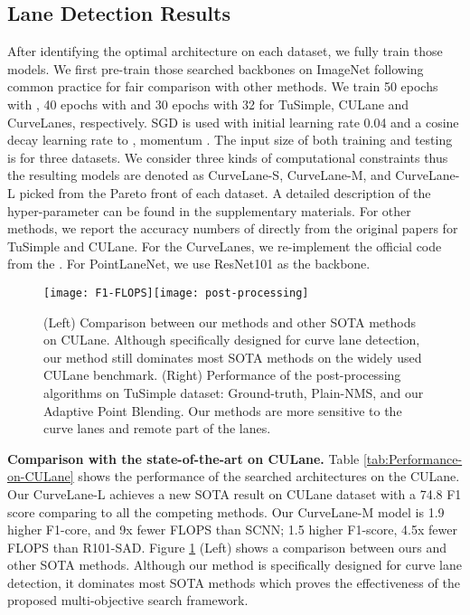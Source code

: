 \documentclass[runningheads]{llncs}
\begin{document}
\textbf{}

\subsection{Lane Detection Results}

After identifying the optimal architecture on each dataset, we fully
train those models. We first pre-train those searched backbones on
ImageNet following common practice \cite{he2016deep} for fair comparison
with other methods. We train 50 epochs with , 40 epochs with
 and 30 epochs with 32 for TuSimple, CULane and CurveLanes,
respectively. SGD is used with initial learning rate 0.04 and a cosine
decay learning rate  to , momentum . The input
size of both training and testing is  for three datasets.
We consider three kinds of computational constraints thus the resulting
models are denoted as CurveLane-S, CurveLane-M, and CurveLane-L picked
from the Pareto front of each dataset.  A detailed description of
the hyper-parameter can be found in the supplementary materials. For
other methods, we report the accuracy numbers of \cite{pan2018spatial,hou2019learning}
directly from the original papers for TuSimple and CULane. For the
CurveLanes, we re-implement the official code from the \cite{pan2018spatial,hou2019learning}. For PointLaneNet\cite{chen2019pointlanenet},
we use ResNet101 as the backbone. 

\begin{figure}[tb]


\begin{centering}
{\tiny{}\texttt{[image: F1-FLOPS]}\texttt{[image: post-processing]}}{\tiny\par}
\par\end{centering}


\caption{\label{fig:Performance-of-the-NMS-SWAP}(Left) Comparison between
our methods and other SOTA methods on CULane. Although specifically
designed for curve lane detection, our method still dominates most
SOTA methods on the widely used CULane benchmark. (Right) Performance
of the post-processing algorithms on TuSimple dataset: Ground-truth,
Plain-NMS, and our Adaptive Point Blending. Our methods are more sensitive
to the curve lanes and remote part of the lanes.}


\end{figure}

\textbf{Comparison with the state-of-the-art on CULane.} Table \ref{tab:Performance-on-CULane}
shows the performance of the searched architectures on the CULane.
Our CurveLane-L achieves a new SOTA result on CULane dataset with
a 74.8 F1 score comparing to all the competing methods. Our CurveLane-M
model is 1.9 higher F1-core, and 9x fewer FLOPS than SCNN; 1.5 higher
F1-score, 4.5x fewer FLOPS than R101-SAD. Figure \ref{fig:Performance-of-the-NMS-SWAP}
(Left) shows a comparison between ours and other SOTA methods. Although
our method is specifically designed for curve lane detection, it dominates
most SOTA methods which proves the effectiveness of the proposed multi-objective
search framework. 
\end{document}
